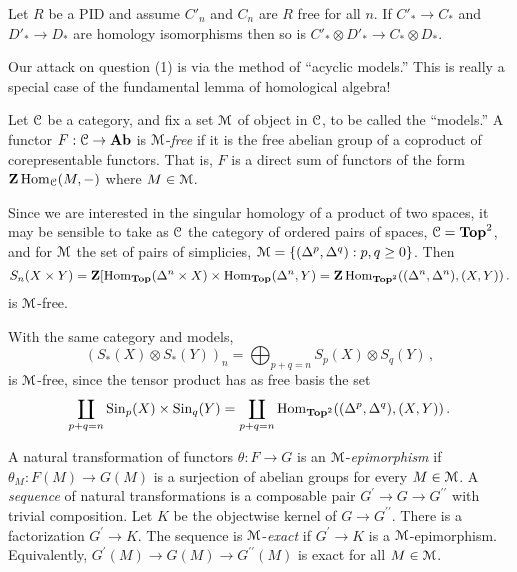\begin{corollary}\label{acyclic-tensor}
Let $R$ be a PID and assume $C'_n$ and $C_n$ are $R$ free for all $n$.
If $C'_\ast\to C_\ast$ and $D'_\ast\to D_\ast$ 
are homology
isomorphisms then so is $C'_\ast\otimes D'_\ast\to C_\ast\otimes D_\ast$. 
\end{corollary}

Our attack on question (1) is via the method of ``acyclic models.'' This is
really a special case of the fundamental lemma of homological algebra!

\begin{definition}
Let $\mathcal C$ be a category, and fix a set $\mathcal M$ of object in $\mathcal C$, 
to be called the ``models.'' 
A functor $F:\mathcal C\to\mathbf{Ab}$ is $\mathcal M$-{\em free} if it is the free abelian 
group of a coproduct of corepresentable functors. That is, $F$ is a 
direct sum of functors of the form $\mathbf Z\operatorname{Hom}_\mathcal C(M,-)$ where $M\in\mathcal M$.
\end{definition}
\begin{example}
Since we are interested in the singular homology of a product of two spaces, 
it may be sensible to take as $\mathcal C$ the category of ordered pairs of spaces,
$\mathcal C=\mathbf{Top}^2$, and for $\mathcal M$ the set of pairs of
simplicies, $\mathcal M=\{(\Delta^p,\Delta^q):p,q\geq0\}$. Then 
\[
S_n(X\times Y)=\mathbf Z[\operatorname{Hom}_\mathbf{Top}(\Delta^n\times X)\times
\operatorname{Hom}_{\mathbf{Top}}(\Delta^n,Y)=
\mathbf Z\operatorname{Hom}_{\mathbf{Top}^2}((\Delta^n,\Delta^n),(X,Y))\,.
\]
is $\mathcal M$-free.
\end{example}
\begin{example}
With the same category and models, 
\[
(S_*(X)\otimes S_*(Y))_n=\bigoplus_{p+q=n}S_p(X)\otimes S_q(Y)\,,
\]
is $\mathcal M$-free, since the tensor product has as free basis the set
\[
\coprod_{p+q=n}\mathrm{Sin}_p(X)\times\mathrm{Sin}_q(Y)
=\coprod_{p+q=n}\operatorname{Hom}_{\mathbf{Top}^2}((\Delta^p,\Delta^q),(X,Y))\,.
\]
\end{example}
\begin{definition}
A natural transformation of functors $\theta:F\to G$ is an $\mathcal M$-{\em epimorphism} if $\theta_M:F(M)\to G(M)$ is a surjection of abelian groups for every $M\in\mathcal M$. A {\em sequence} of natural transformations is a composable pair 
$G^\prime\to G\to G^{\prime\prime}$ with trivial composition. 
Let $K$ be the objectwise kernel of $G\to G^{\prime\prime}$. There is a factorization $G^\prime\to K$. The sequence is $\mathcal M$-{\em exact} if $G^\prime\to K$ is a $\mathcal M$-epimorphism. Equivalently, $G^\prime(M)\to G(M)\to G^{\prime\prime}(M)$ is exact for all $M\in\mathcal M$.
\end{definition}
